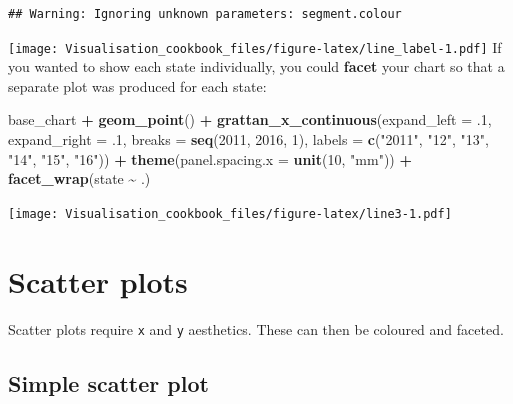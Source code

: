 \documentclass[
]{book}
\newenvironment{Shaded}{\begin{snugshade}}{\end{snugshade}}
\newcommand{\DataTypeTok}[1]{\textcolor[rgb]{0.13,0.29,0.53}{#1}}
\newcommand{\DecValTok}[1]{\textcolor[rgb]{0.00,0.00,0.81}{#1}}
\newcommand{\FloatTok}[1]{\textcolor[rgb]{0.00,0.00,0.81}{#1}}
\newcommand{\KeywordTok}[1]{\textcolor[rgb]{0.13,0.29,0.53}{\textbf{#1}}}
\newcommand{\NormalTok}[1]{#1}
\newcommand{\OperatorTok}[1]{\textcolor[rgb]{0.81,0.36,0.00}{\textbf{#1}}}
\newcommand{\StringTok}[1]{\textcolor[rgb]{0.31,0.60,0.02}{#1}}
\begin{document}
\begin{verbatim}
## Warning: Ignoring unknown parameters: segment.colour
\end{verbatim}

\texttt{[image: Visualisation\_cookbook\_files/figure-latex/line\_label-1.pdf]}
If you wanted to show each state individually, you could \textbf{facet} your chart so that a separate plot was produced for each state:

\begin{Shaded}
\begin{Highlighting}[]
\NormalTok{base\_chart }\OperatorTok{+}
\StringTok{  }\KeywordTok{geom\_point}\NormalTok{() }\OperatorTok{+}
\StringTok{    }\KeywordTok{grattan\_x\_continuous}\NormalTok{(}\DataTypeTok{expand\_left =} \FloatTok{.1}\NormalTok{, }
                         \DataTypeTok{expand\_right =} \FloatTok{.1}\NormalTok{,}
                         \DataTypeTok{breaks =} \KeywordTok{seq}\NormalTok{(}\DecValTok{2011}\NormalTok{, }\DecValTok{2016}\NormalTok{, }\DecValTok{1}\NormalTok{),}
                         \DataTypeTok{labels =} \KeywordTok{c}\NormalTok{(}\StringTok{"2011"}\NormalTok{, }\StringTok{"12"}\NormalTok{, }\StringTok{"13"}\NormalTok{, }\StringTok{"14"}\NormalTok{, }\StringTok{"15"}\NormalTok{, }\StringTok{"16"}\NormalTok{)) }\OperatorTok{+}\StringTok{ }
\StringTok{  }\KeywordTok{theme}\NormalTok{(}\DataTypeTok{panel.spacing.x =} \KeywordTok{unit}\NormalTok{(}\DecValTok{10}\NormalTok{, }\StringTok{"mm"}\NormalTok{)) }\OperatorTok{+}\StringTok{ }
\StringTok{  }\KeywordTok{facet\_wrap}\NormalTok{(state }\OperatorTok{\textasciitilde{}}\StringTok{ }\NormalTok{.)}
\end{Highlighting}
\end{Shaded}

\texttt{[image: Visualisation\_cookbook\_files/figure-latex/line3-1.pdf]}

\hypertarget{scatter-plots}{%
\section{Scatter plots}\label{scatter-plots}}

Scatter plots require \texttt{x} and \texttt{y} aesthetics. These can then be coloured and faceted.

\hypertarget{simple-scatter-plot}{%
\subsection{Simple scatter plot}\label{simple-scatter-plot}}
\end{document}

